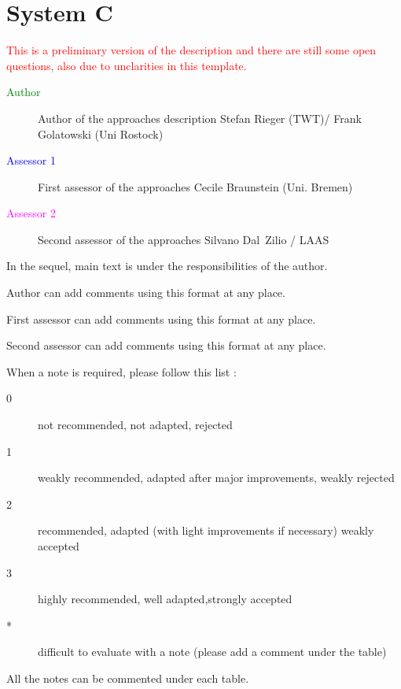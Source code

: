 
\chapter{System C}

\textcolor{red}{
This is a preliminary version of the description and there are still some open questions, also due to unclarities in this template.
}

\begin{description}
\item[\textcolor{green}{Author}] Author of the approaches description Stefan Rieger (TWT)/ Frank Golatowski (Uni Rostock)
\item[\textcolor{blue}{Assessor 1}] First assessor of the approaches Cecile Braunstein (Uni. Bremen)
\item[\textcolor{magenta}{Assessor 2}] Second assessor of the approaches Silvano Dal~Zilio / LAAS
\end{description}

In the sequel, main text is under the responsibilities of the author.

\begin{author_comment}
Author can add comments using this format at any place.
\end{author_comment}

\begin{assessor1}
First assessor can add comments using this format at any place.
\end{assessor1}

\begin{assessor2}
Second assessor can add comments using this format at any place.
\end{assessor2}

When a note is required, please follow this list :
\begin{description}
\item[0] not recommended, not adapted, rejected
\item[1] weakly recommended, adapted after major improvements, weakly rejected
\item[2] recommended, adapted (with light improvements if necessary) weakly accepted
\item[3] highly recommended, well adapted,strongly accepted
\item[*] difficult to evaluate with a note (please add a comment under the table)
\end{description}

All the notes can be commented under each table.

